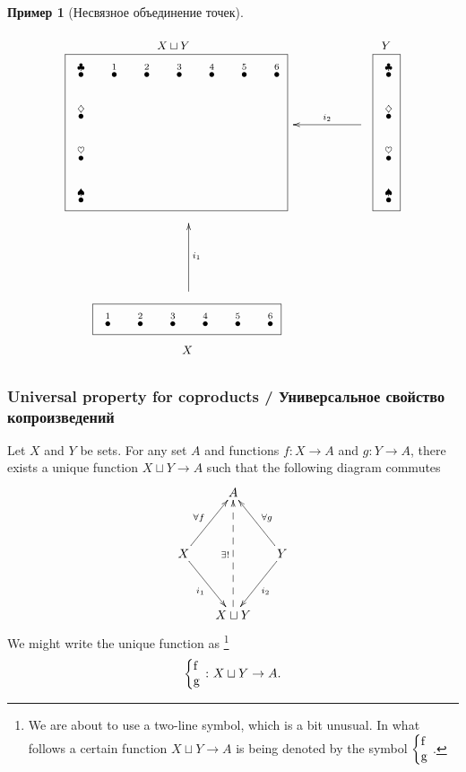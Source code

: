\documentclass[a4paper]{book}
\def\to{\rightarrow}
\def\taking{\colon}
\newcommand{\LMO}[1]{\stackrel{#1}{\bullet}}
\newcommand{\coprodmap}[2]{{\left\{\parbox{.1in}{#1\\#2}\right.}}
\theoremstyle{myth}
\newtheorem{lemmaENG}[envENG]{\begin{english}Lemma\end{english}}
\newtheorem{exampleRUS}[envRUS]{Пример}
\begin{document}
\begin{russian}
\begin{exampleRUS}[Несвязное объединение точек]\label{ex:coprod of dots}
\begin{align}
\parbox{2.4in}{\begin{center}\small $X\sqcup Y$\vspace{-.1in}\end{center}\fbox{
\xymatrix@=15pt{
\LMO{\clubsuit}&\LMO{1}&\LMO{2}&\LMO{3}&\LMO{4}&\LMO{5}&\LMO{6}\\\LMO{\diamondsuit}\\\LMO{\heartsuit}\\\LMO{\spadesuit}
}}}
\parbox{.9in}{
\xymatrix{~&&\ar[ll]_{i_2}~}
}
\parbox{.3in}{\begin{center}\small $Y$\vspace{-.1in}\end{center}\fbox{
\xymatrix@=15pt{
\LMO{\clubsuit}\\\LMO{\diamondsuit}\\\LMO{\heartsuit}\\\LMO{\spadesuit}
}}}
\\\nonumber
\parbox{1in}{\hspace{-1.4in}\xymatrix{~\\\\\ar[uu]_{i_1}}}
\\\nonumber
\parbox{2.1in}{\hspace{-1.3in}\fbox{
\xymatrix@=15pt{
\LMO{1}&\LMO{2}&\LMO{3}&\LMO{4}&\LMO{5}&\LMO{6}
}}\begin{center}\hspace{-2.6in}\small$X$\end{center}}
\end{align}
\end{exampleRUS}


\subsubsection{Universal property for coproducts / Универсальное свойство копроизведений}

\begin{lemmaENG}\label{lemma:up for coprod}
Let $X$ and $Y$ be sets. For any set $A$ and functions $f\taking X\to A$ and $g\taking Y\to A$, there exists a unique function $X\sqcup Y\to A$ such that the following diagram commutes
$$
\xymatrix@=15pt{&A\\\\X\ar[uur]^{\forall f}\ar[ddr]_{i_1}&&Y\ar[uul]_{\forall g}\ar[ddl]^{i_2}\\\\&X\sqcup Y\ar@{-->}[uuuu]^{\exists!}}
$$
We might write the unique function as%
\footnote{We are about to use a two-line symbol, which is a bit unusual. In what follows a certain function $X\sqcup Y\to A$ is being denoted by the symbol $\coprodmap{f}{g}$.}
$$\coprodmap{f}{g}\taking X\sqcup Y\to A.$$
\end{lemmaENG}


\end{russian}
\end{document}
